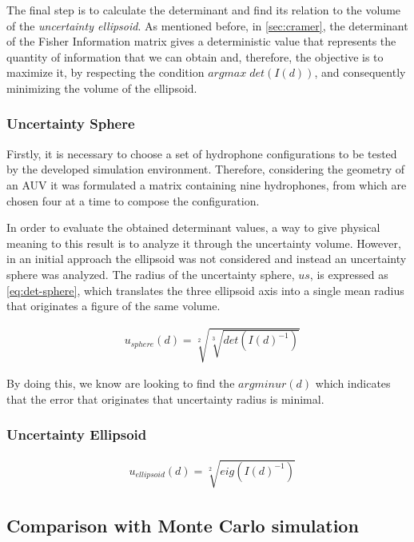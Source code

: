 The final step is to calculate the determinant and find its relation to the volume of the \textit{uncertainty ellipsoid}. As mentioned before, in \ref{sec:cramer}, the determinant of the Fisher Information matrix gives a deterministic value that represents the quantity of information that we can obtain and, therefore, the objective is to maximize it, by respecting the condition $argmax \; det(I(d))$, and consequently minimizing the volume of the ellipsoid. 

\subsubsection{Uncertainty Sphere}

Firstly, it is necessary to choose a set of hydrophone configurations to be tested by the developed simulation environment. Therefore, considering the geometry of an AUV it was formulated a matrix containing nine hydrophones, from which are chosen four at a time to compose the configuration. 

In order to evaluate the obtained determinant values, a way to give physical meaning to this result is to analyze it through the uncertainty volume. However, in an initial approach the ellipsoid was not considered and instead an uncertainty sphere was analyzed. The radius of the uncertainty sphere, $us$, is expressed as \ref{eq:det-sphere}, which translates the three ellipsoid axis into a single mean radius that originates a figure of the same volume.

\begin{eqnarray}
& u_{sphere}(d) = \sqrt[2]{\sqrt[3]{det(I(d)^{-1})}}
\label{eq:det-sphere}
\end{eqnarray}

By doing this, we know are looking to find the $argmin ur(d)$ which indicates that the error that originates that uncertainty radius is minimal.

\subsubsection{Uncertainty Ellipsoid}


\begin{eqnarray}
& u_{ellipsoid}(d) = \sqrt[2]{eig(I(d)^{-1})}
\label{eq:det-ellip}
\end{eqnarray}


\subsection{Comparison with Monte Carlo simulation}

